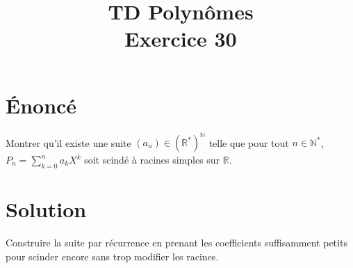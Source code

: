 \documentclass[french]{article}
\title{TD Polynômes \\ Exercice 30}
\date{}
\newcommand{\N}{\mathbb{N}}
\newcommand{\R}{\mathbb{R}}
\newcommand{\st}{^*}
\begin{document}
\maketitle

\section{Énoncé}
Montrer qu'il existe une suite $(a_n)\in(\R\st)^\N$ telle que pour tout $n\in\N\st$, $P_n=\displaystyle\sum_{k=0}^{n}a_kX^k$ soit scindé à racines simples sur $\R$.
\section{Solution}
Construire la suite par récurrence en prenant les coefficients suffisamment petits pour scinder encore sans trop modifier les racines.
\end{document}
